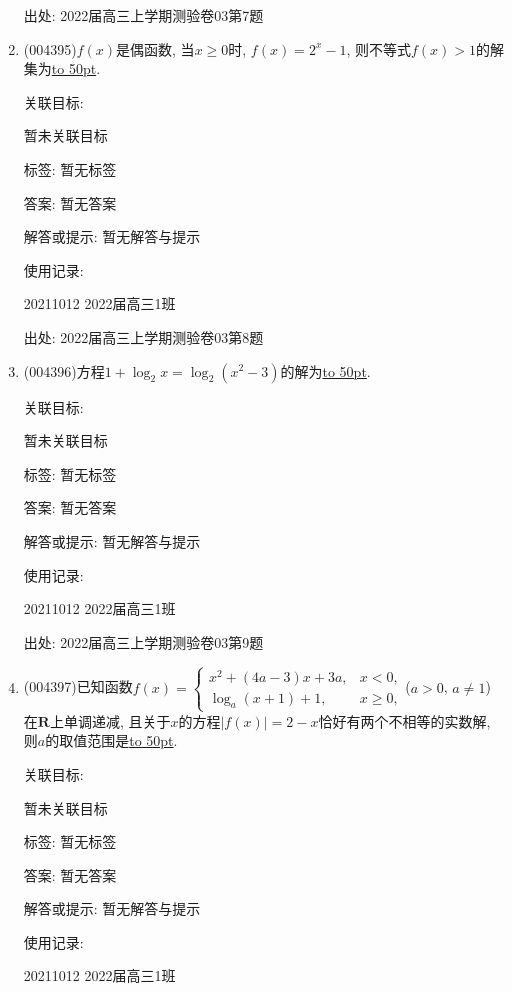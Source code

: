 \documentclass[10pt,a4paper]{article}
\newcommand{\blank}[1]{\underline{\hbox to #1pt{}}}
\begin{document}
\begin{enumerate}[1.]
出处: 2022届高三上学期测验卷03第7题
\item { (004395)}$f(x)$是偶函数, 当$x\ge 0$时, $f(x)=2^x-1$, 则不等式$f(x)>1$的解集为\blank{50}.


关联目标:

暂未关联目标



标签: 暂无标签

答案: 暂无答案

解答或提示: 暂无解答与提示

使用记录:

20211012	2022届高三1班	


出处: 2022届高三上学期测验卷03第8题
\item { (004396)}方程$1+\log_2x=\log_2(x^2-3)$的解为\blank{50}.


关联目标:

暂未关联目标



标签: 暂无标签

答案: 暂无答案

解答或提示: 暂无解答与提示

使用记录:

20211012	2022届高三1班	


出处: 2022届高三上学期测验卷03第9题
\item { (004397)}已知函数$f(x)=\begin{cases}  x^2+(4a-3)x+3a,& x<0, \\ \log_a(x+1)+1,& x\ge 0, \end{cases}$($a>0$, $a\ne 1$)在$\mathbf{R}$上单调递减, 且关于$x$的方程$|f(x)|=2-x$恰好有两个不相等的实数解, 则$a$的取值范围是\blank{50}.


关联目标:

暂未关联目标



标签: 暂无标签

答案: 暂无答案

解答或提示: 暂无解答与提示

使用记录:

20211012	2022届高三1班	



\end{enumerate}
\end{document}
